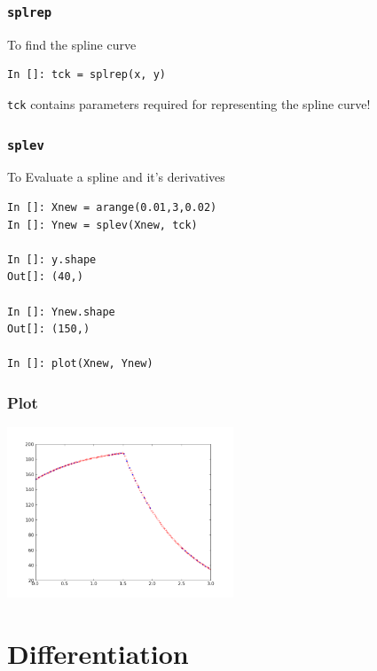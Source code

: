 \documentclass[14pt,compress]{beamer}
\newcommand{\typ}[1]{\lstinline{#1}}
\begin{document}
\begin{frame}[fragile]
\frametitle{\typ{splrep}}
To find the spline curve
\begin{lstlisting}
In []: tck = splrep(x, y)
\end{lstlisting}
\typ{tck} contains parameters required for representing the spline curve!
\end{frame}

\begin{frame}[fragile]
\frametitle{\typ{splev}}
To Evaluate a spline and it's derivatives
\begin{lstlisting}
In []: Xnew = arange(0.01,3,0.02)
In []: Ynew = splev(Xnew, tck)

In []: y.shape
Out[]: (40,)

In []: Ynew.shape
Out[]: (150,)
 
In []: plot(Xnew, Ynew)
\end{lstlisting}

\end{frame}


\begin{frame}
  \frametitle{Plot}
  \begin{center}
    \includegraphics[height=2in, interpolate=true]{data/interpolate}
  \end{center}
\end{frame}

\section{Differentiation}
\end{document}
